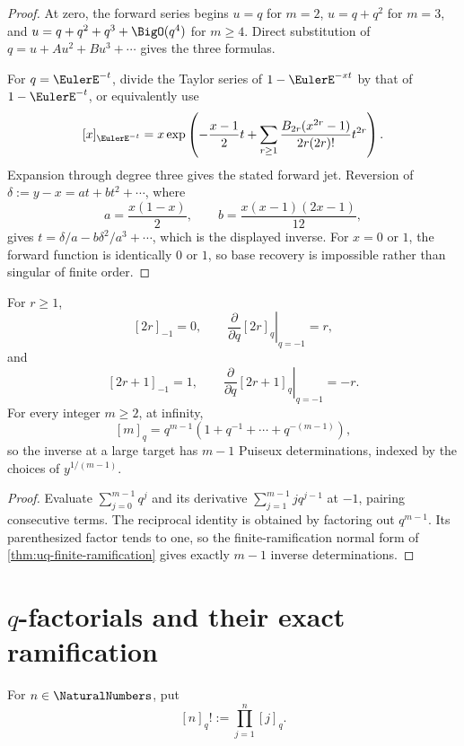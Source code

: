 \begin{proof}
At zero, the forward series begins \(u=q\) for \(m=2\),
\(u=q+q^2\) for \(m=3\), and \(u=q+q^2+q^3+\BigO(q^4)\) for
\(m\ge4\).  Direct substitution of
\(q=u+Au^2+Bu^3+\cdots\) gives the three formulas.

For \(q=\EulerE^{-t}\), divide the Taylor series of
\(1-\EulerE^{-xt}\) by that of \(1-\EulerE^{-t}\), or equivalently use
\[
  [x]_{\EulerE^{-t}}
  =x\exp\left(
    -\frac{x-1}{2}t+
    \sum_{r\ge1}
    \frac{B_{2r}(x^{2r}-1)}{2r(2r)!}t^{2r}
  \right).
\]
Expansion through degree three gives the stated forward jet.  Reversion of
\(\delta:=y-x=a t+b t^2+\cdots\), where
\[
  a=\frac{x(1-x)}2,\qquad
  b=\frac{x(x-1)(2x-1)}{12},
\]
gives \(t=\delta/a-b\delta^2/a^3+\cdots\), which is the displayed inverse.
For \(x=0\) or \(1\), the forward function is identically \(0\) or \(1\), so
base recovery is impossible rather than singular of finite order.
\end{proof}

\begin{proposition}
\label{prop:qs-qnumber-alternating}
For \(r\ge1\),
\[
  [2r]_{-1}=0,\qquad
  \left.\frac{\partial}{\partial q}[2r]_q\right|_{q=-1}=r,
\]
and
\[
  [2r+1]_{-1}=1,\qquad
  \left.\frac{\partial}{\partial q}[2r+1]_q\right|_{q=-1}=-r.
\]
For every integer \(m\ge2\), at infinity,
\[
  [m]_q=q^{m-1}(1+q^{-1}+\cdots+q^{-(m-1)}),
\]
so the inverse at a large target has \(m-1\) Puiseux determinations, indexed
by the choices of \(y^{1/(m-1)}\).
\end{proposition}

\begin{proof}
Evaluate \(\sum_{j=0}^{m-1}q^j\) and its derivative
\(\sum_{j=1}^{m-1}jq^{j-1}\) at \(-1\), pairing consecutive terms.
The reciprocal identity is obtained by factoring out \(q^{m-1}\).  Its
parenthesized factor tends to one, so the finite-ramification normal form of
\cref{thm:uq-finite-ramification} gives exactly \(m-1\) inverse
determinations.
\end{proof}

\section{\texorpdfstring{\(q\)-factorials and their exact ramification}{q-factorials and their exact ramification}}
\label{sec:qs-qfactorials}

For \(n\in\NaturalNumbers\), put
\[
  [n]_q!:=\prod_{j=1}^{n}[j]_q.
\]

